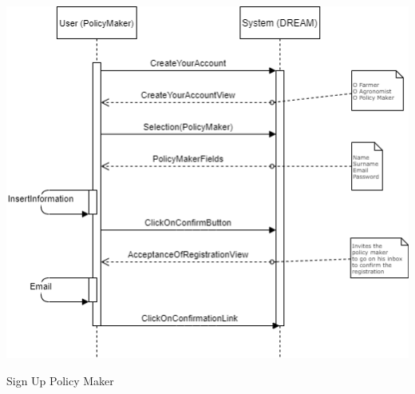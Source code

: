 \documentclass{article}
\begin{document}
\begin{center}
    \includegraphics[width=1.0\textwidth]{images/sequenceDiagrams/20. SignUpPolicyMaker.png}
    \par
    \caption{\label{fig:frog}Sign Up Policy Maker}

    \newpage
    
    
    
    
    
    
    
    
    

\end{center}
\end{document}
